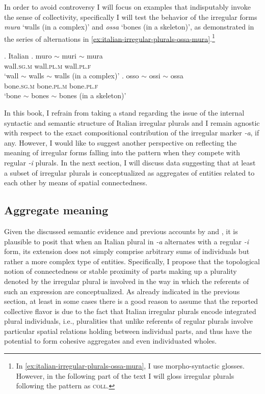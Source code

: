In order to avoid controversy I will focus on examples that indisputably invoke the sense of collectivity, specifically I will test the behavior of the irregular forms \textit{mura} `walls (in a complex)' and \textit{ossa} `bones (in a skeleton)', as demonstrated in the series of alternations in \ref{ex:italian-irregular-plurals-ossa-mura}.{\footnote{In \ref{ex:italian-irregular-plurals-ossa-mura}, I use morpho-syntactic glosses. However, in the following part of the text I will gloss irregular plurals following the pattern as \textsc{coll}.}}

		\ex.\label{ex:italian-irregular-plurals-ossa-mura} Italian
        \ag. muro $\sim$ muri $\sim$ mura\label{ex:italian-irregular-plurals-mura}\\
		wall\textsc{.sg.m} {} wall\textsc{.pl.m} {} wall\textsc{.pl.f}\\
		`wall $\sim$ walls $\sim$ walls (in a complex)'
		\bg. osso $\sim$ ossi $\sim$ ossa\label{ex:italian-irregular-plurals-ossa}\\
		bone\textsc{.sg.m} {} bone\textsc{.pl.m} {} bone\textsc{.pl.f}\\
		`bone $\sim$ bones $\sim$ bones (in a skeleton)'

In this book, I refrain from taking a stand regarding the issue of the internal syntactic and semantic structure of Italian irregular plurals and I remain agnostic with respect to the exact compositional contribution of the irregular marker \textit{-a}, if any. However, I would like to suggest another perspective on reflecting the meaning of irregular forms falling into the pattern when they compete with regular \textit{-i} plurals. In the next section, I will discuss data suggesting that at least a subset of irregular plurals is conceptualized as aggregates of entities related to each other by means of spatial connectedness.

\subsection{Aggregate meaning}\label{sec:aggregate-meaning}

Given the discussed semantic evidence and previous accounts by \citet{ojeda1995semantics} and \citet{acquaviva2008lexical}, it is plausible to posit that when an Italian plural in \textit{-a} alternates with a regular \textit{-i} form, its extension does not simply comprise arbitrary sums of individuals but rather a more complex type of entities. Specifically, I propose that the topological notion of connectedness or stable proximity of parts making up a plurality denoted by the irregular plural is involved in the way in which the referents of such an expression are conceptualized. As already indicated in the previous section, at least in some cases there is a good reason to assume that the reported collective flavor is due to the fact that Italian irregular plurals encode integrated plural individuals, i.e., pluralities that unlike referents of regular plurals involve particular spatial relations holding between individual parts, and thus have the potential to form cohesive aggregates and even individuated wholes.

